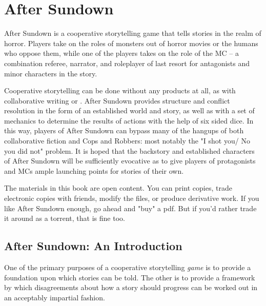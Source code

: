 \chapter{After Sundown}


After Sundown is a cooperative storytelling game that tells stories in the realm of horror. Players take on the roles of monsters out of horror movies or the humans who oppose them, while one of the players takes on the role of the MC -- a combination referee, narrator, and roleplayer of last resort for antagonists and minor characters in the story. 

Cooperative storytelling can be done without any products at all, as with collaborative writing or . After Sundown provides structure and conflict resolution in the form of an established world and story, as well as with a set of mechanics to determine the results of actions with the help of six sided dice. In this way, players of After Sundown can bypass many of the hangups of both collaborative fiction and Cops and Robbers: most notably the "I shot you/ No you did not" problem. It is hoped that the backstory and established characters of After Sundown will be sufficiently evocative as to give players of protagonists and MCs ample launching points for stories of their own. 

The materials in this book are open content. You can print copies, trade electronic copies with friends, modify the files, or produce derivative work. If you like After Sundown enough, go ahead and "buy" a pdf. But if you'd rather trade it around as a torrent, that is fine too.

\section{After Sundown: An Introduction}

One of the primary purposes of a cooperative storytelling \textit{game} is to provide a foundation upon which stories can be told. The other is to provide a framework by which disagreements about how a story should progress can be worked out in an acceptably impartial fashion. 

